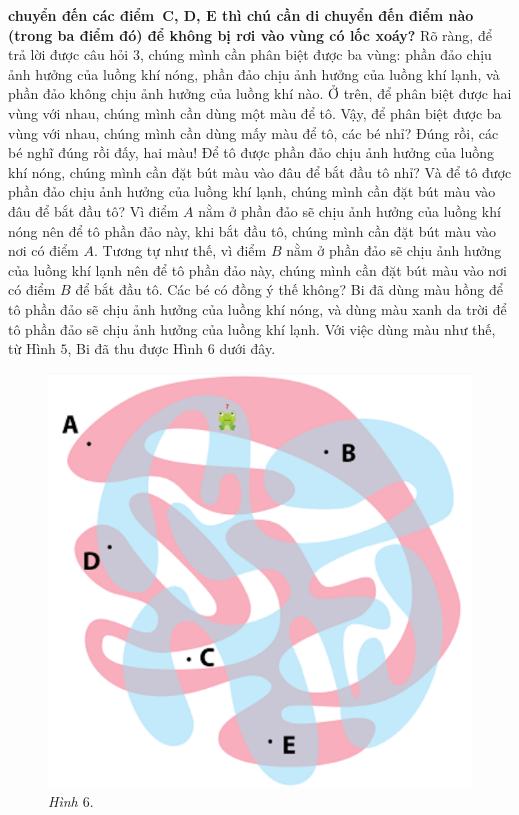 	\textbf{{\color{abc}chuyển đến các điểm~$\pmb C$, $\pmb D$, $\pmb E$ thì chú cần di chuyển đến điểm nào (trong ba điểm đó) để không bị rơi vào vùng có  lốc xoáy?}}
	\vskip 0.1cm
	Rõ ràng, để trả lời được câu hỏi $3$, chúng mình cần phân biệt được ba vùng: phần đảo chịu ảnh hưởng của luồng khí nóng, phần đảo chịu ảnh hưởng của luồng khí lạnh, và phần đảo không chịu ảnh hưởng của luồng khí nào.
	\vskip 0.1cm
	Ở trên, để phân biệt được hai vùng với nhau, chúng mình cần dùng một màu để tô. Vậy, để phân biệt được ba vùng với nhau, chúng mình cần dùng mấy màu để tô, các bé nhỉ? Đúng rồi, các bé nghĩ đúng rồi đấy, hai màu! Để tô được phần đảo chịu ảnh hưởng của luồng khí nóng, chúng mình cần đặt bút màu vào đâu để bắt đầu tô nhỉ? Và để tô được phần đảo chịu ảnh hưởng của luồng khí lạnh, chúng mình cần đặt bút màu vào đâu để bắt đầu tô? Vì điểm $A$ nằm ở phần đảo sẽ chịu ảnh hưởng của luồng khí nóng nên để tô phần đảo này, khi bắt đầu tô, chúng  mình cần đặt bút màu vào nơi có điểm $A$. Tương tự như thế, vì điểm $B$ nằm ở phần đảo sẽ chịu ảnh hưởng của luồng khí lạnh nên để tô phần đảo này, chúng mình cần đặt bút màu vào nơi có điểm $B$ để bắt đầu tô. Các bé có đồng ý  thế không?
	\vskip 0.05cm
	Bi đã dùng màu hồng để tô phần đảo sẽ chịu ảnh hưởng của luồng khí nóng, và dùng màu xanh da trời để tô phần đảo sẽ chịu ảnh hưởng của luồng khí lạnh. Với việc dùng màu như thế, từ Hình $5$, Bi đã thu được Hình $6$ dưới đây.
	\vskip 0.1cm
	\begin{figure}
		\centering
		\vspace*{-5pt}
		\captionsetup{labelformat=empty, justification=centering}
		\includegraphics[scale=0.35]{6}
		\vspace*{-10pt}
		\caption{\textit{\small Hình $6.$}}
		\vspace*{-10pt}
	\end{figure}
